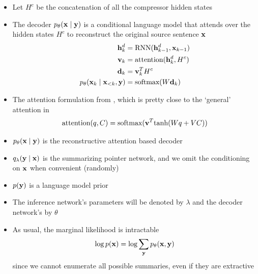 \begin{frame}
\begin{center}
\end{center}
\begin{itemize}
\item Let $H^c$ be the concatenation of all the compressor hidden states
\item The decoder $p_\theta(\mathbf{x}\mid\mathbf{y})$
is a conditional language model that attends over the hidden states $H^c$ 
to reconstruct the original source sentence $\mathbf{x}$
\begin{align}
\mathbf{h}_k^d &= \textrm{RNN}(\mathbf{h}_{k-1}^d, \mathbf{x}_{k-1})\\
\mathbf{v}_k &= \textrm{attention}(\mathbf{h}_k^d, H^c)\\
\mathbf{d}_k &= \mathbf{v}_k^TH^c\\
p_\theta(\mathbf{x}_k\mid\mathbf{x}_{<k}, \mathbf{y}) &= \textrm{softmax}(W \mathbf{d}_k)
\end{align}
\end{itemize}
\end{frame}

\begin{frame}
\begin{center}
\end{center}
\begin{itemize}
\item The attention formulation from \cite{Vinyals2015a},
which is pretty close to the `general' attention in \cite{Luong2015}
\begin{equation}
\textrm{attention}(q, C) = \textrm{softmax}(\mathbf{v}^T\textrm{tanh}(Wq + VC))
\end{equation}
\item $p_\theta(\mathbf{x}\mid\mathbf{y})$ is the reconstructive attention based decoder
\item $q_\lambda(\mathbf{y}\mid\mathbf{x})$ is the summarizing pointer network,
and we omit the conditioning on $\mathbf{x}$ when convenient (randomly)
\item $p(\mathbf{y})$ is a language model prior
\end{itemize}
\end{frame}

\begin{frame}
\begin{center}
\end{center}
\begin{itemize}
\item The inference network's parameters will be denoted by $\lambda$
and the decoder network's by $\theta$
\item As usual, the marginal likelihood is intractable
\begin{equation}
\log p(\mathbf{x}) = \log \sum_{\mathbf{y}} p_\theta(\mathbf{x}, \mathbf{y})
\end{equation}
since we cannot enumerate all possible summaries, even if they are extractive
\end{itemize}
\end{frame}

